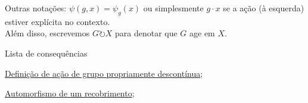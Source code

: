 Outras notações: $\psi(g,x) = \psi_{g}(x)$ ou simplesmente $g\cdot x$ se a ação (à esquerda) estiver explícita no contexto.\\
Além disso, escrevemos $G\circlearrowright X$ para denotar que $G$ age em $X$.


\begin{titlemize}{Lista de consequências}
	\item \hyperref[ações-de-grupo-propriamente-descontínuas-def]{Definição de ação de grupo propriamente descontínua}; %
    	\item \hyperref[automorfismo-de-recobrimento-def]{Automorfismo de um recobrimento};
\end{titlemize}


